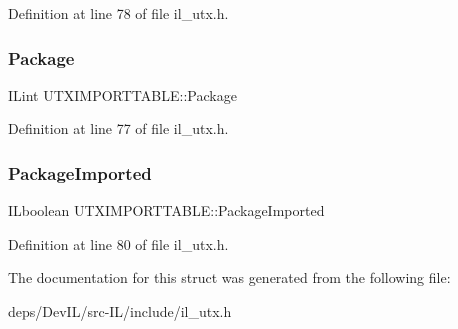 Definition at line 78 of file il\+\_\+utx.\+h.

\mbox{\label{structUTXIMPORTTABLE_abe3af41736943cde23e9d9a4f005cedf}} 
\subsubsection{\texorpdfstring{Package}{Package}}
{\footnotesize\ttfamily I\+Lint U\+T\+X\+I\+M\+P\+O\+R\+T\+T\+A\+B\+L\+E\+::\+Package}



Definition at line 77 of file il\+\_\+utx.\+h.

\mbox{\label{structUTXIMPORTTABLE_aadaba51559fb1b43392156d37d53262a}} 
\subsubsection{\texorpdfstring{Package\+Imported}{PackageImported}}
{\footnotesize\ttfamily I\+Lboolean U\+T\+X\+I\+M\+P\+O\+R\+T\+T\+A\+B\+L\+E\+::\+Package\+Imported}



Definition at line 80 of file il\+\_\+utx.\+h.



The documentation for this struct was generated from the following file\+:\begin{DoxyCompactItemize}
\item 
deps/\+Dev\+I\+L/src-\/\+I\+L/include/il\+\_\+utx.\+h\end{DoxyCompactItemize}
